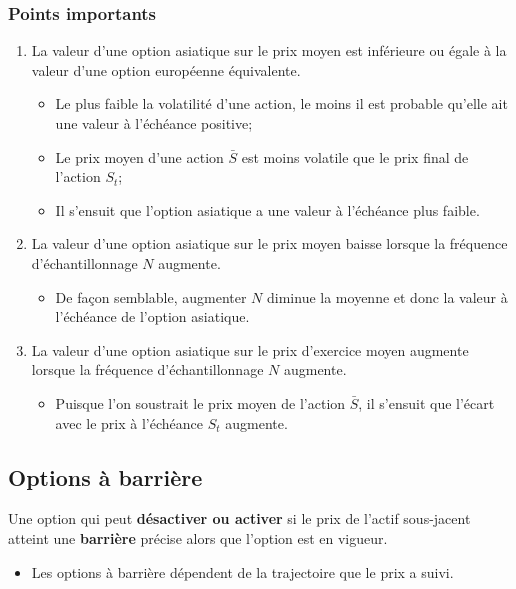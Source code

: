 \documentclass[10pt, french]{article}
\begin{document}
\begin{multicols*}{2}
\subsubsection*{Points importants}
\begin{enumerate}
	\item	La valeur d'une option asiatique sur le prix moyen est inférieure ou égale à la valeur d'une option européenne équivalente.
		\begin{itemize}[leftmargin = *]
		\item	Le plus faible la volatilité d'une action, le moins il est probable qu'elle ait une valeur à l'échéance positive;
		\item	Le prix moyen d'une action $\bar{S}$ est moins volatile que le prix final de l'action $S_{t}$;
		\item	Il s'ensuit que l'option asiatique a une valeur à l'échéance plus faible.
		\end{itemize}
	\item	La valeur d'une option asiatique sur le prix moyen baisse lorsque la fréquence d'échantillonnage $N$ augmente.
		\begin{itemize}[leftmargin = *]
		\item	De façon semblable, augmenter $N$ diminue la moyenne et donc la valeur à l'échéance de l'option asiatique.
		\end{itemize}
	\item	La valeur d'une option asiatique sur le prix d'exercice moyen augmente lorsque la fréquence d'échantillonnage $N$ augmente.
		\begin{itemize}[leftmargin = *]
		\item	Puisque l'on soustrait le prix moyen de l'action $\bar{S}$, il s'ensuit que l'écart avec le prix à l'échéance $S_{t}$ augmente.
		\end{itemize}
\end{enumerate}

\columnbreak
\subsection*{Options à barrière}
\begin{definitionNOHFILL}
Une option qui peut \textbf{désactiver ou activer} si le prix de l'actif sous-jacent atteint une \textbf{barrière} précise alors que l'option est en vigueur.

\tcbline

\begin{itemize}[leftmargin = *]
	\item	Les options à barrière dépendent de la trajectoire que le prix a suivi.
\end{itemize}
\end{definitionNOHFILL}


\end{multicols*}
\end{document}
